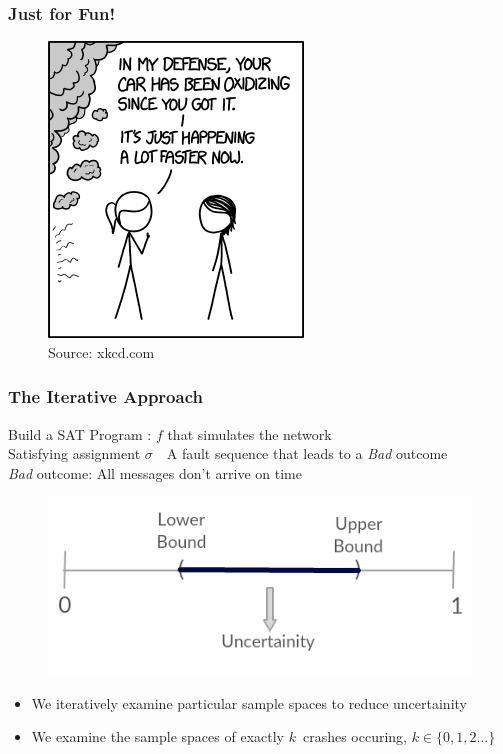 \documentclass{beamer}
\begin{document}

\begin{frame}
\frametitle{Just for Fun!}
	\begin{figure}
	\includegraphics[scale=0.7]{media/xkcd1.png}
	\caption{\tiny Source: xkcd.com}
	\end{figure}
\end{frame}


\begin{frame}
\frametitle{The Iterative Approach}
	Build a SAT Program : $ f $ that simulates the network\\[2ex]
	Satisfying assignment $\sigma$\ \leftrightarrow\ A fault sequence that leads to a \textit{Bad} outcome\\
	\textit{Bad} outcome: All messages don't arrive on time\\[3ex]
	\vspace*{-10pt}
	\begin{figure}
	\includegraphics[scale=0.4]{media/Real_Line.png}
	\end{figure}
	\vspace*{-10pt}
	\begin{itemize}
	\item We iteratively examine particular sample spaces to reduce uncertainity
	\item We examine the sample spaces of exactly $k$\ crashes occuring, $k\in\{0,1,2...\}$
	\end{itemize}
\end{frame}
\end{document}
